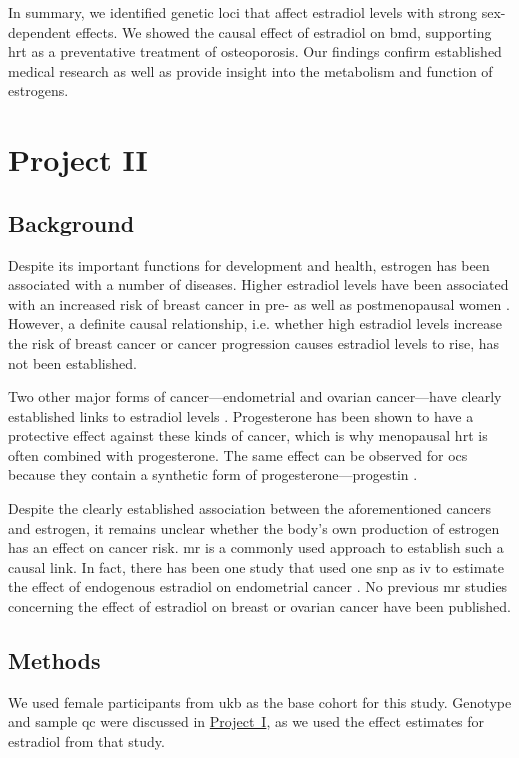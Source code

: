 \documentclass[draft]{scrbook}
\begin{document}
In summary, we identified genetic loci that affect estradiol levels with strong sex-dependent effects.
We showed the causal effect of estradiol on \gls{bmd}, supporting \gls{hrt} as a preventative treatment of osteoporosis.
Our findings confirm established medical research as well as provide insight into the metabolism and function of estrogens.

\chapter{Project II}
\section{Background}
Despite its important functions for development and health, estrogen has been associated with a number of diseases.
Higher estradiol levels have been associated with an increased risk of breast cancer in pre- as well as postmenopausal women \cite{Key2013,Kaaks2005,Zhang2013,Kaaks2005a}.
However, a definite causal relationship, i.e. whether high estradiol levels increase the risk of breast cancer or cancer progression causes estradiol levels to rise, has not been established.

Two other major forms of cancer---endometrial and ovarian cancer---have clearly established links to estradiol levels \cite{Brinton2014,Mungenast2014}.
Progesterone has been shown to have a protective effect against these kinds of cancer, which is why menopausal \gls{hrt} is often combined with progesterone.
The same effect can be observed for \glspl{oc} because they contain a synthetic form of progesterone---progestin \cite{Karlsson2021,Iversen2017}.

Despite the clearly established association between the aforementioned cancers and estrogen, it remains unclear whether the body's own production of estrogen has an effect on cancer risk.
\gls{mr} is a commonly used approach to establish such a causal link.
In fact, there has been one study that used one \gls{snp} as \gls{iv} to estimate the effect of endogenous estradiol on endometrial cancer \cite{Thompson2016}.
No previous \gls{mr} studies concerning the effect of estradiol on breast or ovarian cancer have been published.

\section{Methods}
We used female participants from \gls{ukb} as the base cohort for this study.
Genotype and sample \gls{qc} were discussed in \hyperref[p1methods]{Project~I}, as we used the effect estimates for estradiol from that study.
\end{document}
